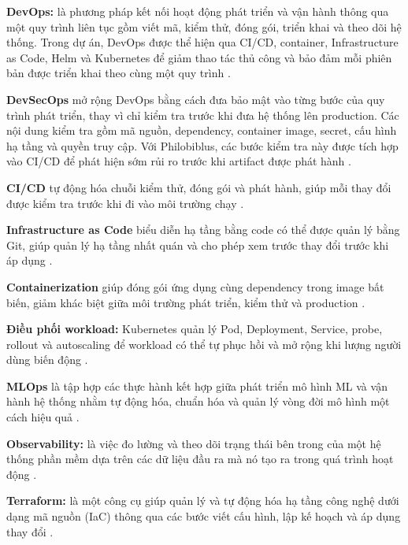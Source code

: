 
\textbf{DevOps:} là phương pháp kết nối hoạt động phát triển và vận hành thông qua một quy trình liên tục gồm viết mã, kiểm thử, đóng gói, triển khai và theo dõi hệ thống. Trong dự án, DevOps được thể hiện qua CI/CD, container, Infrastructure as Code, Helm và Kubernetes để giảm thao tác thủ công và bảo đảm mỗi phiên bản được triển khai theo cùng một quy trình \cite{devops-model}.

\textbf{DevSecOps} mở rộng DevOps bằng cách đưa bảo mật vào từng bước của quy trình phát triển, thay vì chỉ kiểm tra trước khi đưa hệ thống lên production. Các nội dung kiểm tra gồm mã nguồn, dependency, container image, secret, cấu hình hạ tầng và quyền truy cập. Với Philobiblus, các bước kiểm tra này được tích hợp vào CI/CD để phát hiện sớm rủi ro trước khi artifact được phát hành \cite{devsecops-model}.

\textbf{CI/CD} tự động hóa chuỗi kiểm thử, đóng gói và phát hành, giúp mỗi thay đổi được kiểm tra trước khi đi vào môi trường chạy \cite{devops-model,github-actions}.

\textbf{Infrastructure as Code} biểu diễn hạ tầng bằng code có thể được quản lý bằng Git, giúp quản lý hạ tầng nhất quán và cho phép xem trước thay đổi trước khi áp dụng \cite{iac-terraform,terraform-docs}.

\textbf{Containerization} giúp đóng gói ứng dụng cùng dependency trong image bất biến, giảm khác biệt giữa môi trường phát triển, kiểm thử và production \cite{docker}.

\textbf{Điều phối workload:} Kubernetes quản lý Pod, Deployment, Service, probe, rollout và autoscaling để workload có thể tự phục hồi và mở rộng khi lượng người dùng biến động \cite{kubernetes}.

\textbf{MLOps} là tập hợp các thực hành kết hợp giữa phát triển mô hình ML và vận hành hệ thống nhằm tự động hóa, chuẩn hóa và quản lý vòng đời mô hình một cách hiệu quả \cite{mlops-gcp}.

\textbf{Observability:} là việc đo lường và theo dõi trạng thái bên trong của một hệ thống phần mềm dựa trên các dữ liệu đầu ra mà nó tạo ra trong quá trình hoạt động \cite{observability-otel}.

\textbf{Terraform:} là một công cụ giúp quản lý và tự động hóa hạ tầng công nghệ dưới dạng mã nguồn (IaC) thông qua các bước viết cấu hình, lập kế hoạch và áp dụng thay đổi \cite{terraform-docs}.

